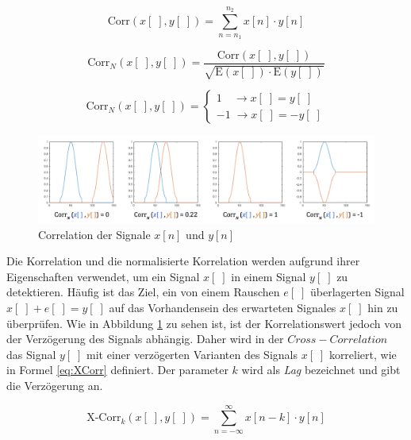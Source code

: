 \begin{equation}
\text{Corr}(x[\;],y[\;]) = \sum_{n=n_1}^{n_2} x[n] \cdot y[n]
\label{eq:correlation}
\end{equation}

\begin{equation}
\text{Corr}_N(x[\;],y[\;]) = \frac{\text{Corr}(x[\;],y[\;])}{\sqrt{\text{E}(x[\;]) \cdot \text{E}(y[\;])}}
\label{eq:normCorrelation}
\end{equation}

\begin{equation}
\text{Corr}_N(x[\;],y[\;]) = 
\begin{cases}
1  \quad \rightarrow  x[\;] = y[\;] \\
-1 \; \rightarrow x[\;] = -y[\;]
\end{cases}
\label{eq:correlationProps}
\end{equation}

\begin{figure}[h]
	\centering
	\includegraphics[width=1\textwidth]{bilder/corrSigsComp02.png}
	\caption{Correlation der Signale $x[n]$ und $y[n]$}
	\label{img:corrSigsComp}
\end{figure}

Die Korrelation und die normalisierte Korrelation werden aufgrund ihrer Eigenschaften verwendet, um ein Signal $x[\;]$ in einem Signal $y[\;]$ zu detektieren. Häufig ist das Ziel, ein von einem Rauschen $e[\;]$ überlagerten Signal $x[\;]+e[\;] = y[\;]$ auf das Vorhandensein des erwarteten Signales $x[\;]$ hin zu überprüfen. Wie in Abbildung \ref{img:corrSigsComp} zu sehen ist, ist der Korrelationswert jedoch von der Verzögerung des Signals abhängig. Daher wird in der $Cross-Correlation$ das Signal $y[\;]$ mit einer verzögerten Varianten des Signals $x[\;]$ korreliert, wie in Formel \ref{eq:XCorr} definiert. Der parameter $k$ wird als \emph{Lag} bezeichnet und gibt die Verzögerung an. 

\begin{equation}
\text{X-Corr}_k(x[\;],y[\;]) = \sum_{n=-\infty}^{\infty} x[n-k] \cdot y[n]
\label{eq:XCorr}
\end{equation}

